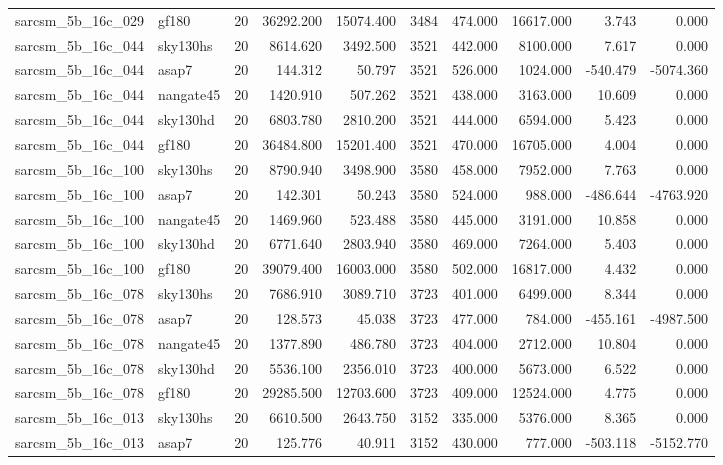 \documentclass{article}
\begin{document}
\begin{longtable}{llrrrrrrrr}
sarcsm\_5b\_16c\_029 & gf180 & 20 & 36292.200 & 15074.400 & 3484 & 474.000 & 16617.000 & 3.743 & 0.000 \\
sarcsm\_5b\_16c\_044 & sky130hs & 20 & 8614.620 & 3492.500 & 3521 & 442.000 & 8100.000 & 7.617 & 0.000 \\
sarcsm\_5b\_16c\_044 & asap7 & 20 & 144.312 & 50.797 & 3521 & 526.000 & 1024.000 & -540.479 & -5074.360 \\
sarcsm\_5b\_16c\_044 & nangate45 & 20 & 1420.910 & 507.262 & 3521 & 438.000 & 3163.000 & 10.609 & 0.000 \\
sarcsm\_5b\_16c\_044 & sky130hd & 20 & 6803.780 & 2810.200 & 3521 & 444.000 & 6594.000 & 5.423 & 0.000 \\
sarcsm\_5b\_16c\_044 & gf180 & 20 & 36484.800 & 15201.400 & 3521 & 470.000 & 16705.000 & 4.004 & 0.000 \\
sarcsm\_5b\_16c\_100 & sky130hs & 20 & 8790.940 & 3498.900 & 3580 & 458.000 & 7952.000 & 7.763 & 0.000 \\
sarcsm\_5b\_16c\_100 & asap7 & 20 & 142.301 & 50.243 & 3580 & 524.000 & 988.000 & -486.644 & -4763.920 \\
sarcsm\_5b\_16c\_100 & nangate45 & 20 & 1469.960 & 523.488 & 3580 & 445.000 & 3191.000 & 10.858 & 0.000 \\
sarcsm\_5b\_16c\_100 & sky130hd & 20 & 6771.640 & 2803.940 & 3580 & 469.000 & 7264.000 & 5.403 & 0.000 \\
sarcsm\_5b\_16c\_100 & gf180 & 20 & 39079.400 & 16003.000 & 3580 & 502.000 & 16817.000 & 4.432 & 0.000 \\
sarcsm\_5b\_16c\_078 & sky130hs & 20 & 7686.910 & 3089.710 & 3723 & 401.000 & 6499.000 & 8.344 & 0.000 \\
sarcsm\_5b\_16c\_078 & asap7 & 20 & 128.573 & 45.038 & 3723 & 477.000 & 784.000 & -455.161 & -4987.500 \\
sarcsm\_5b\_16c\_078 & nangate45 & 20 & 1377.890 & 486.780 & 3723 & 404.000 & 2712.000 & 10.804 & 0.000 \\
sarcsm\_5b\_16c\_078 & sky130hd & 20 & 5536.100 & 2356.010 & 3723 & 400.000 & 5673.000 & 6.522 & 0.000 \\
sarcsm\_5b\_16c\_078 & gf180 & 20 & 29285.500 & 12703.600 & 3723 & 409.000 & 12524.000 & 4.775 & 0.000 \\
sarcsm\_5b\_16c\_013 & sky130hs & 20 & 6610.500 & 2643.750 & 3152 & 335.000 & 5376.000 & 8.365 & 0.000 \\
sarcsm\_5b\_16c\_013 & asap7 & 20 & 125.776 & 40.911 & 3152 & 430.000 & 777.000 & -503.118 & -5152.770 \\

\end{longtable}
\end{document}
